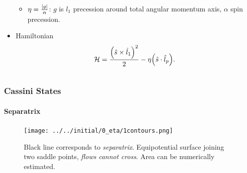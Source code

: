\documentclass[dvipsnames]{beamer}
\DeclarePairedDelimiter\abs{\lvert}{\rvert}
\DeclarePairedDelimiter\p{\lparen}{\rparen}
\begin{document}
\begin{frame}
\begin{columns}
\begin{column}{0.45\textwidth}
\begin{itemize}
\begin{itemize}
                    \item $\eta = \frac{\abs*{g}}{\alpha}$: $g$ is $\hat{l}_1$
                        precession around total angular momentum axis, $\alpha$ spin
                        precession.
                \end{itemize}
                \item Hamiltonian
                    \begin{equation*}
                        \mathcal{H} = \frac{\p*{\hat{s} \times \hat{l}_1}^2}{2}
                            - \eta\p*{\hat{s} \cdot \hat{l}_p}.
                    \end{equation*}
            \end{itemize}
        \end{column}
    \end{columns}
\end{frame}

\begin{frame}
    \frametitle{Cassini States}
    \framesubtitle{Separatrix}

    \begin{figure}[t]
        \centering
        \texttt{[image: ../../initial/0\_eta/1contours.png]}
        \caption{Black line corresponds to \emph{separatrix}. Equipotential
        surface joining two saddle points, \emph{flows cannot cross}. Area can
        be numerically estimated.}
    \end{figure}
\end{frame}
\end{document}
